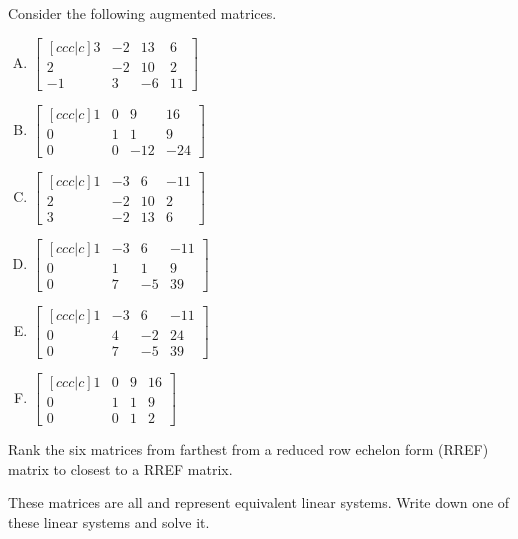 \begin{applicationActivities}{1}{3}
\begin{activity}{10}
Consider the following augmented matrices.
\begin{multicols}{3}
\begin{enumerate}[(A)]
\item \( \begin{bmatrix}[ccc|c] 3 & -2 & 13 & 6 \\ 2 & -2 & 10 & 2 \\ -1 & 3 & -6 & 11 \end{bmatrix} \)
\item \( \begin{bmatrix}[ccc|c] 1 & 0 & 9 & 16 \\ 0 & 1 & 1 & 9 \\ 0 & 0 & -12 & -24 \end{bmatrix} \)
\item \( \begin{bmatrix}[ccc|c] 1 & -3 & 6 & -11 \\ 2 & -2 & 10 & 2 \\ 3 & -2 & 13 & 6 \end{bmatrix} \)
\item \( \begin{bmatrix}[ccc|c] 1 & -3 & 6 & -11 \\ 0 & 1 & 1 & 9 \\ 0 & 7 & -5 & 39 \end{bmatrix} \)
\item \( \begin{bmatrix}[ccc|c] 1 & -3 & 6 & -11 \\ 0 & 4 & -2 & 24 \\ 0 & 7 & -5 & 39 \end{bmatrix} \)
\item \( \begin{bmatrix}[ccc|c] 1 & 0 & 9 & 16 \\ 0 & 1 & 1 & 9 \\ 0 & 0 & 1 & 2 \end{bmatrix} \)
\end{enumerate}
\end{multicols}
\begin{subactivity}
Rank the six matrices from farthest from a reduced row echelon form (RREF) matrix to closest to a RREF matrix.
\end{subactivity}
\begin{subactivity}
These matrices are all  and represent equivalent linear systems.
Write down one of these linear systems and solve it.
\end{subactivity}
\end{activity}


\end{applicationActivities}
